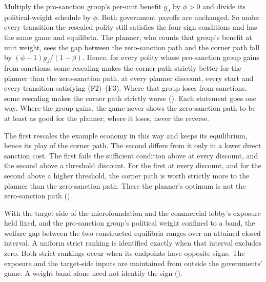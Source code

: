 Multiply the pro-sanction group's per-unit benefit $g_J$ by $\phi>0$ and divide its
political-weight schedule by $\phi$. Both government payoffs are unchanged. So
under every transition the rescaled polity still satisfies the four sign
conditions and has the same game and equilibria. The planner, who counts that
group's benefit at unit weight, sees the gap between the zero-sanction path and
the corner path fall by $(\phi-1)g_J/(1-\beta)$. Hence, for every polity whose
pro-sanction group gains from sanctions, some rescaling makes the corner path
strictly better for the planner than the zero-sanction path, at every planner
discount, every start and every transition satisfying \textup{(F2)--(F3)}. Where
that group loses from sanctions, some rescaling makes the corner path strictly
worse (). Each statement goes one way. Where the group
gains, the game never shows the zero-sanction path to be at least as good for the
planner; where it loses, never the reverse.

 The first rescales the example
economy in this way and keeps its equilibrium, hence its play of the corner path.
The second differs from it only in a lower direct sanction cost. The first fails
the sufficient condition above at every discount, and the second above a
threshold discount. For the first at every discount, and for the second above a
higher threshold, the corner path is worth strictly more to the planner than the
zero-sanction path. There the planner's optimum is not the zero-sanction path
().

 With the target side of the microfoundation and the
commercial lobby's exposure held fixed, and the pro-sanction group's political
weight confined to a band, the welfare gap between the two constructed equilibria
ranges over an attained closed interval. A uniform strict ranking is identified
exactly when that interval excludes zero. Both strict rankings occur when its
endpoints have opposite signs. The exposure and the target-side inputs are
maintained from outside the governments' game. A weight
band alone need not identify the sign ().
